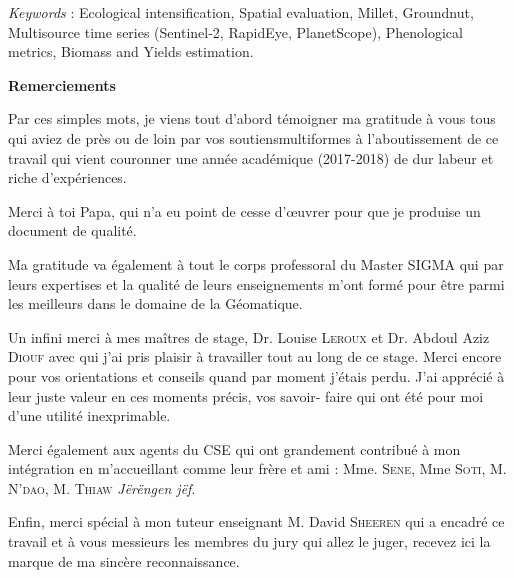 \documentclass[a4paper,12pt,oneside,chapterprefix=false]{scrbook}
\newenvironment{abstract}%
{\cleardoublepage\thispagestyle{empty}\null\vfill\begin{center}%
\sffamily\bfseries \abstractname \end{center}}%
{\vfill\null}
\newenvironment{acknowledgements}%
{\cleardoublepage\thispagestyle{empty}\null\vfill\begin{center}%
\sffamily\bfseries Remerciements \end{center}}%
{\vfill\null}
\begin{document}
\begin {abstract}
    \vspace{8mm}
    
    \emph{Keywords} : Ecological intensification, Spatial evaluation, Millet, Groundnut, Multisource time series (Sentinel-2, RapidEye, PlanetScope), Phenological metrics, Biomass and Yields estimation.
    
    \end{abstract}

  
    \begin{acknowledgements}
    \thispagestyle{plain}
    
    \vspace{5mm}
    
    {\selectfont \large{Par ces simples mots, je viens tout d’abord témoigner ma gratitude à vous tous qui aviez de près ou de loin par vos soutiensmultiformes à l’aboutissement de ce travail qui vient couronner une année académique (2017-2018)
    de dur labeur et riche d’expériences.}}
    
    \vspace{5mm}
    
    {\selectfont \large{Merci à toi Papa, qui n’a eu point de cesse d’\oe uvrer pour que je produise un document de qualité.}}
    
    \vspace{5mm}
    
    {\selectfont \large{Ma gratitude va également à tout le corps professoral du Master SIGMA qui par leurs expertises et la qualité de leurs enseignements m’ont formé pour être parmi les meilleurs dans le domaine de la Géomatique.}}
    
    \vspace{5mm}
    
    {\selectfont \large{Un infini merci à mes maîtres de stage, Dr. Louise \textsc{Leroux} et Dr. Abdoul
    Aziz \textsc{Diouf} avec qui j’ai pris plaisir à travailler tout au long de ce stage.
    Merci encore pour vos orientations et conseils quand par moment j’étais
    perdu. J’ai apprécié à leur juste valeur en ces moments précis, vos savoir-
    faire qui ont été pour moi d’une utilité inexprimable.}}
    
    \vspace{5mm}
    
    {\selectfont \large{Merci également aux agents du CSE qui ont grandement contribué à mon intégration en m’accueillant comme leur frère et ami : Mme. \textsc{Sene}, Mme \textsc{Soti}, M. \textsc{N’dao}, M. \textsc{Thiaw} \emph{Jërëngen jëf}.}}
    
    \vspace{5mm}
    
    {\selectfont \large{Enfin, merci spécial à mon tuteur enseignant M. David \textsc{Sheeren} qui
    a encadré ce travail et à vous messieurs les membres du jury qui allez le
    juger, recevez ici la marque de ma sincère reconnaissance.}}
    
    \end{acknowledgements}
\end{document}
